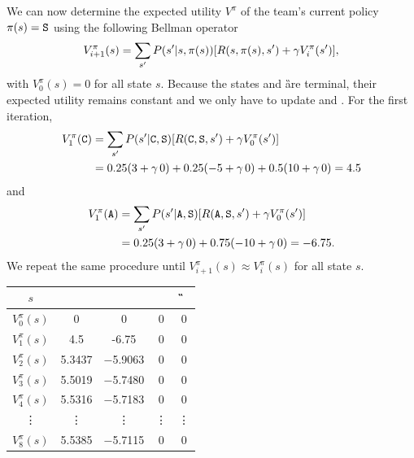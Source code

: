 \documentclass[11pt, a4paper]{article}
\begin{document}
\begin{enumerate}
\begin{solution}
        We can now determine the expected utility $V^\pi$ of the team's current policy $\pi(s) = \S$ using the following Bellman operator
        \begin{equation*}
            V_{i + 1}^\pi(s) = \sum_{s'} P(s' | s, \pi(s)) \sbk*{R(s, \pi(s), s') + \gamma V_i^\pi(s')} ,
        \end{equation*}
        with $V_0^\pi(s) = 0$ for all state $s$. Because the states \F and \G are terminal, their expected utility remains constant and we only have to update \C and \A. For the first iteration,
        \begin{align*}
            V_1^\pi(\C) & = \sum_{s'} P(s' | \C, \S) \sbk*{R(\C, \S, s') + \gamma V_0^\pi(s')} \\
            & = 0.25 (3 + \gamma \, 0) + 0.25 (-5 + \gamma \, 0) + 0.5 (10 + \gamma \, 0) = 4.5
        \end{align*}
        and
        \begin{align*}
            V_1^\pi(\A) & = \sum_{s'} P(s' | \A, \S) \sbk*{R(\A, \S, s') + \gamma V_0^\pi(s')} \\
            & = 0.25 (3 + \gamma \, 0) + 0.75 (-10 + \gamma \, 0) = -6.75 .
        \end{align*}
        We repeat the same procedure until $V_{i + 1}^\pi(s) \approx V_i^\pi(s)$ for all state $s$.

        \begin{table}[h]
            \centering
            \begin{tabular}{c|cccc}
                \toprule
                $s$ & \C & \A & \F & \G \\
                \midrule
                $V_0^\pi(s)$ & 0 & 0 & 0 & 0 \\
                $V_1^\pi(s)$ & 4.5 & -6.75 & 0 & 0 \\
                $V_2^\pi(s)$ & \num{5.3437} & \num{-5.9063} & 0 & 0 \\
                $V_3^\pi(s)$ & \num{5.5019} & \num{-5.7480} & 0 & 0 \\
                $V_4^\pi(s)$ & \num{5.5316} & \num{-5.7183} & 0 & 0 \\
                \vdots       & \vdots & \vdots & \vdots & \vdots \\
                $V_8^\pi(s)$ & \num{5.5385} & \num{-5.7115} & 0 & 0 \\
                \bottomrule
            \end{tabular}
        \end{table}
    \end{solution}

\end{enumerate}
\end{document}
